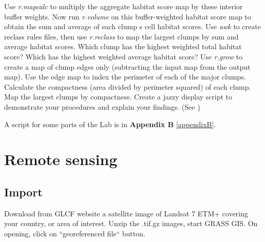 Use \textit{r.mapcalc} to multiply the aggregate habitat score map by these interior buffer weights.
Now run \textit{r.volume }on this buffer-weighted habitat score map to obtain the sum and average of each clump s cell habitat scores.
Use \textit{awk} to create reclass rules files, then use \textit{r.reclass} to map the largest clumps by sum and average habitat scores.
Which clump has the highest weighted total habitat score? Which has the highest weighted average habitat score?
Use \textit{r.grow} to create a map of clump edges only (subtracting the input map from the output map).
Use the edge map to index the perimeter of each of the major clumps. 
Calculate the compactness (area divided by perimeter squared) of each clump. 
Map the largest clumps by compactness. Create a jazzy display script to demonstrate your procedures and explain your findings.
(See \href{http://www.udel.edu/johnmack/frec682/script_ideas.html})

A script for some parts of the Lab is in \textbf{Appendix B} \ref{appendixB}.

\newpage
\section{Remote sensing}
\label{remote_sensing}

\subsection{Import}
\label{Import}

Download from GLCF website a satellite image of Landsat 7 ETM+ covering your country, or area of interest.
Unzip the .tif.gz images, start GRASS GIS. On opening, click on ``georeferenced file`` button.

